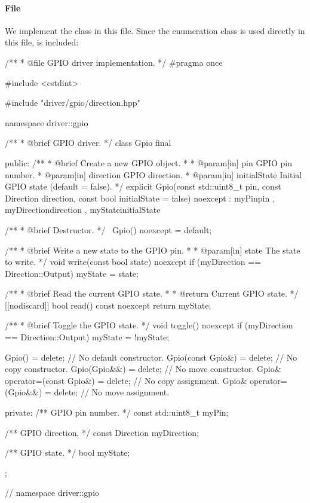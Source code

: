 \paragraph{File }
We implement the class  in this file. Since the enumeration class  is
used directly in this file,  is included:

\begin{cppcode}
/**
 * @file GPIO driver implementation.
 */
#pragma once

#include <cstdint>

#include "driver/gpio/direction.hpp"

namespace driver::gpio
{
/**
 * @brief GPIO driver.
 */
class Gpio final
{
public:
    /**
     * @brief Create a new GPIO object.
     *
     * @param[in] pin GPIO pin number.
     * @param[in] direction GPIO direction.
     * @param[in] initialState Initial GPIO state (default = false).
     */
    explicit Gpio(const std::uint8_t pin, const Direction direction,
                  const bool initialState = false) noexcept
        : myPin{pin}
        , myDirection{direction}
        , myState{initialState}
    {}

    /**
     * @brief Destructor.
     */
    ~Gpio() noexcept = default;

    /**
     * @brief Write a new state to the GPIO pin.
     *
     * @param[in] state The state to write.
     */
    void write(const bool state) noexcept
    {
        if (myDirection == Direction::Output)
        {
            myState = state;
        }
    }

    /**
     * @brief Read the current GPIO state.
     *
     * @return Current GPIO state.
     */
    [[nodiscard]] bool read() const noexcept { return myState; }

    /**
     * @brief Toggle the GPIO state.
     */
    void toggle() noexcept
    {
        if (myDirection == Direction::Output)
        {
            myState = !myState;
        }
    }

    Gpio()                       = delete; // No default constructor.
    Gpio(const Gpio&)            = delete; // No copy constructor.
    Gpio(Gpio&&)                 = delete; // No move constructor.
    Gpio& operator=(const Gpio&) = delete; // No copy assignment.
    Gpio& operator=(Gpio&&)      = delete; // No move assignment.

private:
    /** GPIO pin number. */
    const std::uint8_t myPin;

    /** GPIO direction. */
    const Direction myDirection;

    /** GPIO state. */
    bool myState;
};
} // namespace driver::gpio
\end{cppcode}

